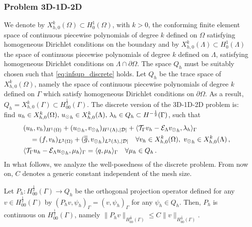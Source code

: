 \documentclass[r]{siamart171218}
\newcommand{\paolo}[1]{{\color{black}#1}}
\begin{document}
\subsubsection{Problem 3D-1D-2D}
We denote by $X_{h,0}^k(\Omega)\subset H^1_0(\Omega)$, with $k>0$, the conforming finite element space of continuous piecewise polynomials of degree $k$ defined on $\Omega$ satisfying homogeneous Dirichlet conditions on the boundary and by $X_{h,0}^k(\Lambda)\subset H^1_0(\Lambda)$ the space of continuous piecewise polynomials of degree $k$ defined on $\Lambda$, satisfying homogeneous Dirichlet conditions on $\Lambda \cap \partial \Omega$. The space $Q_h$ must be suitably chosen such that \eqref{eq:infsup_discrete} holds. Let $Q_h$ be the trace space of $X_{h,0}^k(\Omega)$, namely the space of continuous piecewise polynomials of degree $k$ defined on $\Gamma$ which satisfy homogeneous Dirichlet conditions on $\partial \Omega$. As a result, $Q_h=X_{h,0}^k(\Gamma) \subset H^\frac12_{00}(\Gamma)$. The discrete version of the 3D-1D-2D problem is:
find $u_h \in X_{h,0}^k (\Omega) ,\, {u_{\odot}}_h \in X_{h,0}^k(\Lambda) ,\, \lambda_h \in Q_h \subset H^{-\frac12}(\Gamma )$, such that
\begin{subequations}
\begin{align}
&(u_h,v_h)_{H^1(\Omega)} + ({\ud}_h,{\vd}_h)_{H^1(\Lambda),|\D|}
+ \langle \trace v_h  - \mathcal{E}_{\Lambda} {\vd}_h, \lambda_h \rangle_\Gamma
\\
\nonumber
&\quad = (f,v_h)_{L^2(\Omega)} + (\avrd{g},{\vd}_h)_{L^2(\Lambda),|\D|} 
\quad \forall v_h \in X_{h,0}^k(\Omega), \ {\vd}_h \in X_{h,0}^k(\Lambda)\,,
\\
&\langle \trace u_h - \mathcal{E}_{\Lambda} {\ud}_h , \mu_h \rangle_\Gamma 
= \paolo{\langle q,\mu_h \rangle_\Gamma}
\quad \forall \mu_h \in Q_h\,.
\end{align}
\end{subequations}
In what follows, we analyze the well-posedness of the discrete problem. 
From now on, $C$ denotes a generic constant independent of the mesh size.

\begin{lemma}\label{lemma:prob1_orthproj}
Let $P_h: H^{\frac 12}_{00}(\Gamma) \rightarrow Q_h$ be the orthogonal projection operator defined  for any $v \in H^{\frac 12}_{00}(\Gamma)$ by
$(P_h v , \psi_h)_\Gamma= (v, \psi_h)_\Gamma$ for any $\psi_h \in Q_h$.
Then, $P_h$ is continuous on $H^{\frac 12}_{00}(\Gamma)$, namely
$\|P_h v\|_{H^{\frac 12}_{00}(\Gamma)} \leq C \|v\|_{H^{\frac 12}_{00}(\Gamma)}$.
\end{lemma}
\end{document}
